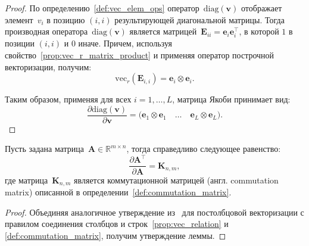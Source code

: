 \begin{proof}
    По определению~\ref{def:vec_elem_ops} оператор~$\mathrm{diag}(\mathbf{v})$ отображает элемент~$v_i$ в позицию $(i,i)$ результирующей диагональной матрицы.
    Тогда производная оператора~$\mathrm{diag}(\mathbf{v})$ является матрицей~$\mathbf{E}_{ii} = \mathbf{e}_i \mathbf{e}_i^\top$, в которой $1$ в позиции $(i,i)$ и $0$ иначе. Причем, используя свойство~\ref{prop:vec_r_matrix_product} и применяя оператор построчной векторизации, получим:
    \begin{equation}
        \mathrm{vec}_r(\mathbf{E}_{i,i}) = \mathbf{e}_i \otimes \mathbf{e}_i.
    \end{equation}

    Таким образом, применяя для всех $i=1,\dots,L$, матрица Якоби принимает вид:
    \begin{equation}
        \frac{\partial \mathrm{diag}(\mathbf{v})}{\partial \mathbf{v}}
        = \big(\mathbf{e}_1 \otimes \mathbf{e}_1 \quad \dots \quad \mathbf{e}_L \otimes \mathbf{e}_L\big).
    \end{equation}
\end{proof}

\begin{lemma}\label{lemma:transposed_matrix_derivative}
    Пусть задана матрица~$\mathbf{A} \in \mathbb{R}^{m \times n}$, тогда справедливо следующее равенство:
    \begin{equation}
        \frac{\partial \mathbf{A}^\top}{\partial \mathbf{A}} = \mathbf{K}_{n, m},
    \end{equation}
    где матрица~$\mathbf{K}_{n, m}$ является коммутационной матрицей (англ. commutation matrix) описанной в определении~\ref{def:commutation_matrix}.
\end{lemma}
\begin{proof}
    Объединяя аналогичное утверждение из~\cite{magnus1988matrix} для постолбцовой векторизации с правилом соединения столбцов и строк~\ref{prop:vec_relation} и \ref{def:commutation_matrix}, получим утверждение леммы.
\end{proof}

